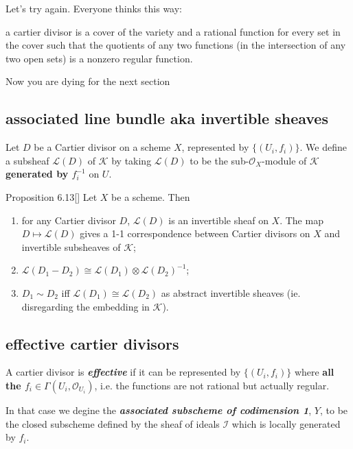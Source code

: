 Let's try again. Everyone thinks this way:
\begin{tcolorbox}[colback=white,colframe=black,boxrule=0.5pt,sharp corners]
a cartier divisor is a cover of the variety and a rational function for every set in the cover such that the quotients of any two functions (in the intersection of any two open sets) is a nonzero regular function.
\end{tcolorbox}
Now you are dying for the next section
\subsection{associated line bundle aka invertible sheaves}

Let \(D\) be a Cartier divisor on a scheme \(X\), represented by \(\{(U_i,f_i)\}\). We define a subsheaf \(\mathcal{L}(D)\) of \(\mathcal{K}\) by taking \(\mathcal{L}(D)\) to be the sub-\(\mathcal{O}_X\)-module of \(\mathcal{K}\) \textbf{generated by \(f_i^{-1}\)} on \(U\).

\begin{thing6}{Proposition 6.13}[\cite{har}]\label{prop:6.13}\leavevmode
Let \(X\) be a scheme. Then
\begin{enumerate}[label=(\alph*)]
\item for any Cartier divisor \(D\), \(\mathcal{L}(D)\) is an invertible sheaf on \(X\). The map \(D \mapsto  \mathcal{L}(D)\) gives a 1-1 correspondence between Cartier divisors on \(X\) and invertible subsheaves of \(\mathcal{K}\);
\item \(\mathcal{L}(D_1-D_2)\cong\mathcal{L}(D_1)\otimes \mathcal{L}(D_2)^{-1}\);
\item \(D_1 \sim D_2\) iff \(\mathcal{L}(D_1)\cong\mathcal{L}(D_2)\) as abstract invertible sheaves (ie. disregarding the embedding in \(\mathcal{K}\)).
\end{enumerate}
\end{thing6}

\subsection{effective cartier divisors}

A cartier divisor is \textit{\textbf{effective}} if it can be represented by \(\{(U_i,f_i)\}\) where \textbf{all the \(f_i\in \Gamma(U_i,\mathcal{O}_{U_i})\)}, i.e. the functions are not rational but actually regular.

In that case we degine the \textit{\textbf{associated subscheme of codimension 1}}, \(Y\), to be the closed subscheme defined by the sheaf of ideals \(\mathcal{I}\) which is locally generated by \(f_i\).

